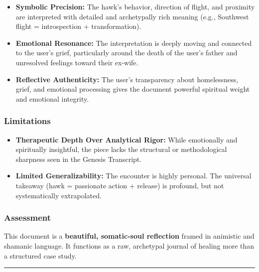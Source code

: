 \documentclass{article}
\begin{document}
\begin{itemize}
\item
  \textbf{Symbolic Precision:} The hawk's behavior, direction of flight,
  and proximity are interpreted with detailed and archetypally rich
  meaning (e.g., Southwest flight = introspection + transformation).
\item
  \textbf{Emotional Resonance:} The interpretation is deeply moving and
  connected to the user's grief, particularly around the death of the
  user's father and unresolved feelings toward their ex-wife.
\item
  \textbf{Reflective Authenticity:} The user's transparency about
  homelessness, grief, and emotional processing gives the document
  powerful spiritual weight and emotional integrity.
\end{itemize}

\subsubsection*{\texorpdfstring{\textbf{Limitations}}{Limitations}}\label{limitations-1}

\begin{itemize}
\item
  \textbf{Therapeutic Depth Over Analytical Rigor:} While emotionally
  and spiritually insightful, the piece lacks the structural or
  methodological sharpness seen in the Genesis Transcript.
\item
  \textbf{Limited Generalizability:} The encounter is highly personal.
  The universal takeaway (hawk = passionate action + release) is
  profound, but not systematically extrapolated.
\end{itemize}

\subsubsection*{\texorpdfstring{\textbf{Assessment}}{Assessment}}\label{assessment-1}

This document is a \textbf{beautiful, somatic-soul reflection} framed in
animistic and shamanic language. It functions as a raw, archetypal
journal of healing more than a structured case study.

\begin{center}\rule{0.5\linewidth}{0.5pt}\end{center}

\subsection*{}\label{section-6}
\end{document}
